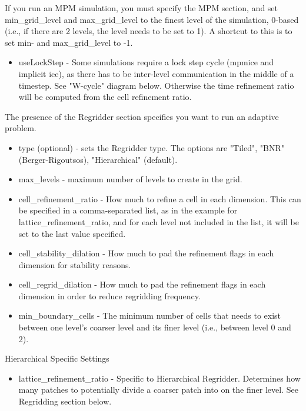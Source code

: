 If you run an MPM simulation, you must specify the MPM section, and
set min\_grid\_level and max\_grid\_level to the finest level of the
simulation, 0-based (i.e., if there are 2 levels, the level needs to
be set to 1). A shortcut to this is to set min- and max\_grid\_level to
-1.

\begin{itemize}
\item useLockStep - Some simulations require a lock step cycle (mpmice
  and implicit ice), as there has to be inter-level communication in
  the middle of a timestep. See "W-cycle" diagram below. Otherwise the
  time refinement ratio will be computed from the cell refinement
  ratio.
\end{itemize}


The presence of the Regridder section specifies you want to run an
adaptive problem.
\begin{itemize}
  \item type (optional) - sets the Regridder type. The options are
   "Tiled", "BNR" (Berger-Rigoutsos), "Hierarchical" (default).
 \item max\_levels - maximum number of levels to create in the grid. 
 \item cell\_refinement\_ratio - How much to refine a cell in each
   dimension. This can be specified in a comma-separated list, as in
   the example for lattice\_refinement\_ratio, and for each level not
   included in the list, it will be set to the last value specified.
 \item cell\_stability\_dilation - How much to pad the refinement flags
   in each dimension for stability reasons.
 \item cell\_regrid\_dilation - How much to pad the refinement flags in
   each dimension in order to reduce regridding frequency.
 \item min\_boundary\_cells - The minimum number of cells that needs to
   exist between one level's coarser level and its finer level (i.e.,
   between level 0 and 2).
\end{itemize}

Hierarchical Specific Settings

\begin{itemize}
\item lattice\_refinement\_ratio - Specific to Hierarchical
  Regridder. Determines how many patches to potentially divide a
  coarser patch into on the finer level. See Regridding section below.
\end{itemize}

